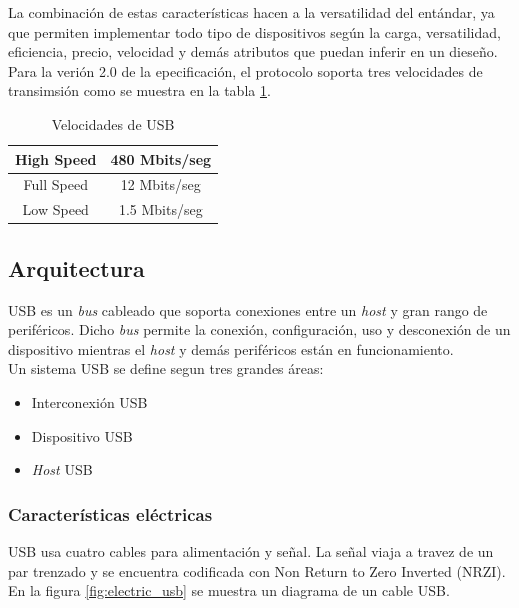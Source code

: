 La combinaci\'on de estas caracter\'isticas hacen a la versatilidad del
ent\'andar, ya que permiten implementar todo tipo de dispositivos seg\'un la
carga, versatilidad, eficiencia, precio, velocidad y dem\'as atributos que
puedan inferir en un diese\~no.\\

Para la veri\'on 2.0 de la epecificaci\'on, el protocolo soporta tres
velocidades de transimsi\'on como se muestra en la
tabla \ref{tab:velocidad_usb}.

\begin{table}[h]
\centering
\begin{tabular}{|c|c|}        \hline
High Speed & 480 Mbits/seg \\ \hline 
Full Speed & 12 Mbits/seg  \\ \hline
Low Speed & 1.5 Mbits/seg  \\ \hline
\end{tabular}
\caption{Velocidades de USB} 
\label{tab:velocidad_usb}
\end{table}

\subsection{Arquitectura}

USB es un \emph{bus} cableado que soporta conexiones entre un \emph{host} y
gran rango de perif\'ericos. Dicho \emph{bus} permite la conexi\'on,
configuraci\'on, uso y desconexi\'on de un dispositivo mientras el \emph{host}
y dem\'as perif\'ericos est\'an en funcionamiento. \\

Un sistema USB se  define segun tres grandes \'areas:

\begin{itemize}
 \item Interconexi\'on USB
 \item Dispositivo USB
 \item \emph{Host} USB
\end{itemize}

\subsubsection{Caracter\'isticas el\'ectricas}

USB usa cuatro cables para alimentaci\'on y se\~nal. La se\~nal viaja a travez
de un par trenzado y se encuentra codificada con Non Return to Zero Inverted
(NRZI). En la figura \ref{fig:electric_usb} se muestra un diagrama de un cable
USB.

